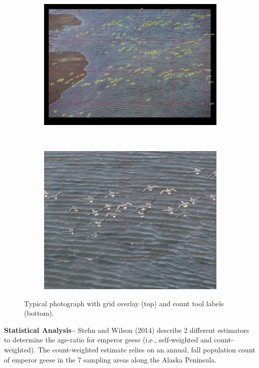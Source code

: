 \documentclass[]{article}
\begin{document}
\begin{figure}
\centering
\begin{subfigure}[h]{0.9\textwidth}
\includegraphics[width=1\linewidth]{figure3a.jpg}
\end{subfigure}
\\
\begin{subfigure}[h]{0.9\textwidth}
\includegraphics[width=1\linewidth]{figure3b.jpg}
\end{subfigure}
\caption{Typical photograph with grid overlay (top) and count tool labels (bottom).}
\end{figure}

\textbf{Statistical Analysis--} Stehn and Wilson (2014) describe 2
different estimators to determine the age-ratio for emperor geese (i.e.,
self-weighted and count-weighted). The count-weighted estimate relies on
an annual, fall population count of emperor geese in the 7 sampling
areas along the Alaska Peninsula.
\end{document}
